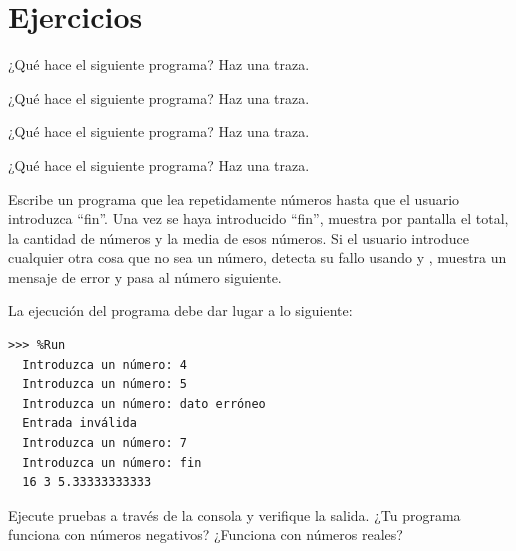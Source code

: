 \section*{Ejercicios}\label{ejercicios}

\begin{ejercicio}
¿Qué hace el siguiente programa? Haz una traza. 
\end{ejercicio}

\begin{ejercicio}
¿Qué hace el siguiente programa? Haz una traza. 
\end{ejercicio}

\begin{ejercicio}
¿Qué hace el siguiente programa? Haz una traza. 
\end{ejercicio}

\begin{ejercicio}
¿Qué hace el siguiente programa? Haz una traza. 
\end{ejercicio}

\begin{ejercicio}

Escribe un programa que lea repetidamente números
hasta que el usuario introduzca ``fin''. Una vez se haya introducido
``fin'', muestra por pantalla el total, la cantidad de números y la
media de esos números. Si el usuario introduce cualquier otra cosa que
no sea un número, detecta su fallo usando  y
, muestra un mensaje de error y pasa al número
siguiente.

La ejecución del programa debe dar lugar a lo siguiente:\\

\begin{Verbatim}[frame=single, label={\em ejemplo de ejecución}]
>>> %Run
  Introduzca un número: 4
  Introduzca un número: 5
  Introduzca un número: dato erróneo
  Entrada inválida
  Introduzca un número: 7
  Introduzca un número: fin
  16 3 5.33333333333
\end{Verbatim}

Ejecute pruebas a través de la consola y verifique la salida. ¿Tu programa funciona con números negativos? ¿Funciona con números reales? 
\end{ejercicio}


